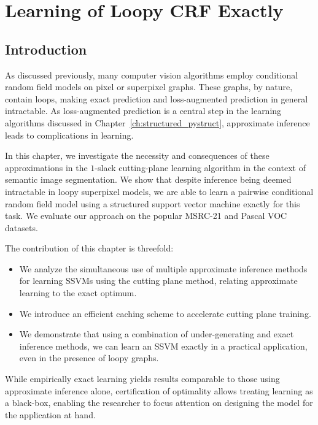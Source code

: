\chapter{Learning of Loopy CRF Exactly}\label{ch:exact_learning}

\section{Introduction}
As discussed previously, %
many computer vision algorithms employ conditional random
field models on pixel or superpixel graphs. These graphs, by nature, contain loops,
making exact prediction and loss-augmented prediction in general intractable.
As loss-augmented prediction is a central step in the learning algorithms
discussed in Chapter~\ref{ch:structured_pystruct}, approximate inference leads
to complications in learning.

In this chapter, we investigate the necessity and consequences of these
approximations in the $1$-slack cutting-plane learning algorithm in the context of semantic
image segmentation. We show that despite inference being deemed intractable in
loopy superpixel models, we are able to learn a pairwise conditional random
field model using a structured support vector machine exactly for this task.
We evaluate our approach on the popular MSRC-21 and Pascal VOC datasets. %

The contribution of this chapter is threefold:
\begin{itemize}
    \item We analyze the simultaneous use of multiple approximate inference
        methods for learning SSVMs using the cutting plane method, relating
        approximate learning to the exact optimum. %
    \item We introduce an efficient caching scheme to accelerate cutting plane
        training.
    \item We demonstrate that using a combination of under-generating and exact
        inference methods, we can learn an SSVM exactly in a practical
        application, even in the presence of loopy graphs.
\end{itemize}

While empirically exact learning yields results comparable to those using
approximate inference alone, certification of optimality allows treating
learning as a black-box, enabling the researcher to focus attention on
designing the model for the application at hand.


